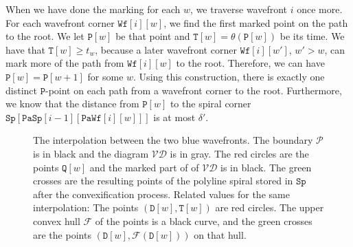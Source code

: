 \documentclass[3p]{elsarticle}
\newcommand{\VD}{\mathcal{VD}}
\newcommand{\PP}{\mathcal{P}}
\newcommand{\PPP}{\texttt{P}}
\newcommand{\FF}{\mathcal F}
\newcommand{\stepover}{\delta}
\newcommand{\wavefront}{\texttt{Wf}}
\newcommand{\spiral}{\texttt{Sp}}
\newcommand{\parent}{\texttt{Pa}}
\newcommand{\parentWavefrontCorner}{\parent\wavefront}
\newcommand{\parentSpiralCorner}{\parent\spiral}
\begin{document}
When we have done the marking for each $w$, we traverse wavefront $i$ once more.
For each wavefront corner $\wavefront[i][w]$,
we find the first marked point on the path
to the root. We let $\PPP[w]$ be that point and
$\texttt{T}[w]=\theta(\PPP[w])$ be its time. We have that $\texttt{T}[w] \geq t_w$, because
a later wavefront corner $\wavefront[i][w']$, $w'>w$, can mark more of the path from
$\wavefront[i][w]$ to the root. Therefore, we can have $\PPP[w]=\PPP[w+1]$ for some $w$.
Using this construction, there is exactly one distinct
$\PPP$-point on each path from a wavefront corner to the root.
Furthermore, we know that the distance from $\PPP[w]$ to the spiral corner
$\spiral[\parentSpiralCorner[i-1][\parentWavefrontCorner[i][w]]]$
is at most $\stepover'$.

\begin{figure*}[h]
\centering
{}\quad
{}
\caption{ The interpolation between the two blue wavefronts. The boundary
$\PP$ is in black and the diagram $\VD$ is in gray. The red circles
are the points $\texttt Q[w]$ and the marked part of of $\VD$ is in black. The green crosses
are the resulting points of the polyline spiral stored in $\spiral$ after the convexification process.
 Related values for the same interpolation:
The points $(\texttt D[w],\texttt T[w])$ are red circles.
The upper convex hull $\FF$ of the points is a black curve, and the green crosses are the points
$(\texttt D[w],\FF(\texttt D[w]))$ on that hull.}
\label{interpolationDetail}
\end{figure*}
\end{document}
